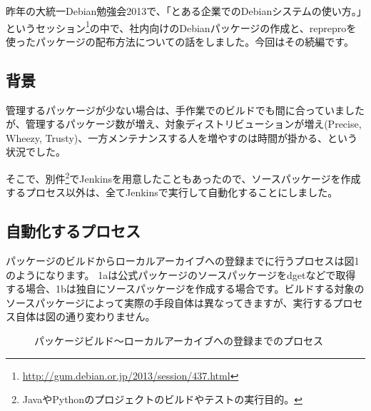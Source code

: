 \documentclass[mingoth,a4paper]{jsarticle}
\begin{document}
昨年の大統一Debian勉強会2013で、「とある企業でのDebianシステムの使い方。」というセッション\footnote{\url{http://gum.debian.or.jp/2013/session/437.html}}の中で、社内向けのDebianパッケージの作成と、repreproを使ったパッケージの配布方法についての話をしました。今回はその続編です。

\subsection{背景}

管理するパッケージが少ない場合は、手作業でのビルドでも間に合っていましたが、管理するパッケージ数が増え、対象ディストリビューションが増え(Precise, Wheezy, Trusty)、一方メンテナンスする人を増やすのは時間が掛かる、という状況でした。

そこで、別件\footnote{JavaやPythonのプロジェクトのビルドやテストの実行目的。}でJenkinsを用意したこともあったので、ソースパッケージを作成するプロセス以外は、全てJenkinsで実行して自動化することにしました。

\subsection{自動化するプロセス}

パッケージのビルドからローカルアーカイブへの登録までに行うプロセスは図1のようになります。
1aは公式パッケージのソースパッケージをdgetなどで取得する場合、1bは独自にソースパッケージを作成する場合です。ビルドする対象のソースパッケージによって実際の手段自体は異なってきますが、実行するプロセス自体は図の通り変わりません。

\begin{figure}[H]
\begin{center}
\caption{パッケージビルド〜ローカルアーカイブへの登録までのプロセス}
\end{center}
\end{figure}
\end{document}
